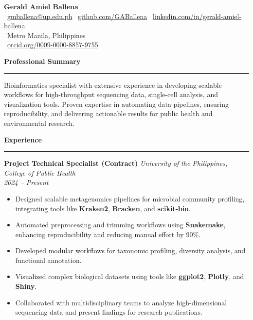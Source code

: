 \documentclass[a4paper,10pt]{article}
\newcommand{\sectiontitle}[1]{\vspace{10pt}\textbf{\Large #1}\vspace{5pt}\hrule\vspace{10pt}}
\begin{document}
	
	\begin{center}
		{\Huge \textbf{Gerald Amiel Ballena}} \\
		\vspace{3pt}
		\faEnvelope \ \href{mailto:gmballena@up.edu.ph}{gmballena@up.edu.ph} \quad
		\faGithub \ \href{https://github.com/GABallena}{github.com/GABallena} \quad
		\faLinkedin \ \href{https://linkedin.com/in/gerald-amiel-ballena}{linkedin.com/in/gerald-amiel-ballena} \\
		\vspace{3pt}
		\faMapMarker \ Metro Manila, Philippines \\
		 \ \href{https://orcid.org/0009-0000-8857-9755}{orcid.org/0009-0000-8857-9755}
	\end{center}
	
	\sectiontitle{Professional Summary}
	Bioinformatics specialist with extensive experience in developing scalable workflows for high-throughput sequencing data, single-cell analysis, and visualization tools. Proven expertise in automating data pipelines, ensuring reproducibility, and delivering actionable results for public health and environmental research.
	
	\sectiontitle{Experience}
	
	\textbf{Project Technical Specialist (Contract)} \hfill \textit{University of the Philippines, College of Public Health} \\
	\textit{2024 – Present}
	\begin{itemize}[left=0pt]
		\item Designed scalable metagenomics pipelines for microbial community profiling, integrating tools like \textbf{Kraken2}, \textbf{Bracken}, and \textbf{scikit-bio}.
		\item Automated preprocessing and trimming workflows using \textbf{Snakemake}, enhancing reproducibility and reducing manual effort by 90\%.
		\item Developed modular workflows for taxonomic profiling, diversity analysis, and functional annotation.
		\item Visualized complex biological datasets using tools like \textbf{ggplot2}, \textbf{Plotly}, and \textbf{Shiny}.
		\item Collaborated with multidisciplinary teams to analyze high-dimensional sequencing data and present findings for research publications.
	\end{itemize}
	
\end{document}
